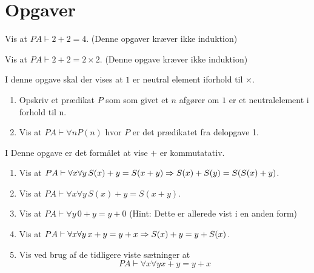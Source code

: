 \ifx\preampleIncluded\undefined
\def\startOpgaverPeano{}


\fi
\section{Opgaver}
\begin{opg}
    Vis at $PA \vdash 2+2 = 4$. (Denne opgaver kræver ikke induktion)
\end{opg}

\begin{opg}
    Vis at $PA \vdash 2+2 = 2 \times 2$. (Denne opgave kræver ikke induktion)
\end{opg}

\begin{opg}
    I denne opgave skal der vises at $1$ er neutral element iforhold til $\times$.
    \begin{enumerate}
        \item Opskriv et prædikat $P$ som som givet et $n$ afgører om $1$ er et neutralelement i forhold til n.
        \item Vis at $PA \vdash \forall n P(n)$ hvor $P$ er det prædikatet fra delopgave 1.
    \end{enumerate}
\end{opg}

\begin{opg}
    I Denne opgave er det formålet at vise $+$ er kommutatativ.
    \begin{enumerate}
        \item Vis at $PA \vdash \forall x \forall y \, S(x) + y = S(x + y) \Rightarrow S(x) + S(y) = S(S(x) + y)$.
        \item Vis at $PA \vdash \forall x \forall y \, S(x) + y = S(x + y)$.
        \item Vis at $PA \vdash \forall y \, 0+y=y+0$ (Hint: Dette er allerede vist i en anden form)
        \item Vis at $PA \vdash \forall x \forall y \, x+y = y+x \Rightarrow S(x) + y = y + S(x)$.
        \item Vis ved brug af de tidligere viste sætninger at 
            \[PA \vdash \forall x \forall y x+y = y+x \]
    \end{enumerate}
\end{opg}

\ifdefined\startOpgaverPeano\fi
